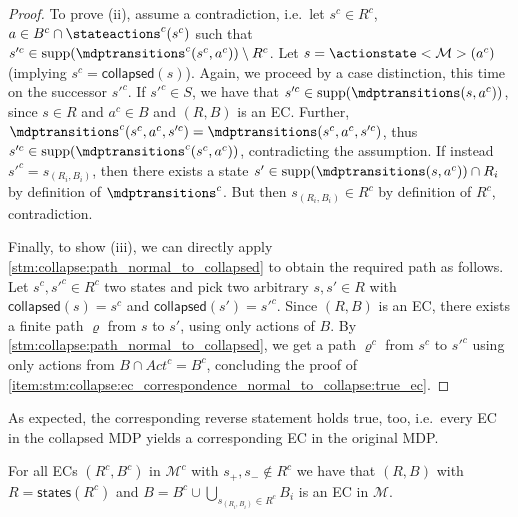\documentclass{article}
\newcommand{\unionSym}{\cup}
\newcommand{\unionBin}{\mathbin{\unionSym}}
\newcommand{\intersectionSym}{\cap}
\newcommand{\intersectionBin}{\mathbin{\intersectionSym}}
\newcommand{\UnionSym}{\bigcup}
\newcommand{\union}{\unionBin}
\newcommand{\intersection}{\intersectionBin}
\newcommand{\Union}{\UnionSym}
\newcommand{\MDP}{\mathcal{M}}
\newcommand{\States}{S}
\newcommand{\Actions}{Act}
\newcommand{\finitepath}{\varrho}
\DeclareMathOperator{\support}{supp}
\newcommand{\targetstate}{s_+}
\newcommand{\sinkstate}{s_-}
\newcommand{\eccollapsed}{\mathsf{collapsed}}
\newcommand{\ecstates}{\mathsf{states}}
\begin{document}
\begin{proof}
	To prove (ii), assume a contradiction, i.e.\ let $s^c \in R^c$, $a \in B^c \intersection \stateactions^c(s^c)$ such that $s'^c \in \support(\mdptransitions^c(s^c, a^c)) \setminus R^c$.
	Let $s = \actionstate<\MDP>(a^c)$ (implying $s^c = \eccollapsed(s)$).
	Again, we proceed by a case distinction, this time on the successor $s'^c$.
	If $s'^c \in \States$, we have that $s'^c \in \support(\mdptransitions(s, a^c))$, since $s \in R$ and $a^c \in B$ and $(R, B)$ is an EC.
	Further, $\mdptransitions^c(s^c, a^c, s'^c) = \mdptransitions(s^c, a^c, s'^c)$, thus $s'^c \in \support(\mdptransitions^c(s^c, a^c))$, contradicting the assumption.
	If instead $s'^c = s_{(R_i, B_i)}$, then there exists a state $s' \in \support(\mdptransitions(s, a^c)) \intersection R_i$ by definition of $\mdptransitions^c$.
	But then $s_{(R_i, B_i)} \in R^c$ by definition of $R^c$, contradiction.

	Finally, to show (iii), we can directly apply \cref{stm:collapse:path_normal_to_collapsed} to obtain the required path as follows.
	Let $s^c, s'^c \in R^c$ two states and pick two arbitrary $s, s' \in R$ with $\eccollapsed(s) = s^c$ and $\eccollapsed(s') = s'^c$.
	Since $(R, B)$ is an EC, there exists a finite path $\finitepath$ from $s$ to $s'$, using only actions of $B$.
	By \cref{stm:collapse:path_normal_to_collapsed}, we get a path $\finitepath^c$ from $s^c$ to $s'^c$ using only actions from $B \intersection \Actions^c = B^c$, concluding the proof of \cref{item:stm:collapse:ec_correspondence_normal_to_collapse:true_ec}. 
\end{proof}
As expected, the corresponding reverse statement holds true, too, i.e.\ every EC in the collapsed MDP yields a corresponding EC in the original MDP.
\begin{lemma} \label{stm:collapse:ec_correspondence_collapse_to_normal}
	For all ECs $(R^c, B^c)$ in $\MDP^c$ with $\targetstate, \sinkstate \notin R^c$ we have that $(R, B)$ with $R = \ecstates(R^c)$ and $B = B^c \union \Union_{s_{(R_i, B_i)} \in R^c} B_i$ is an EC in $\MDP$.
\end{lemma}
\end{document}

